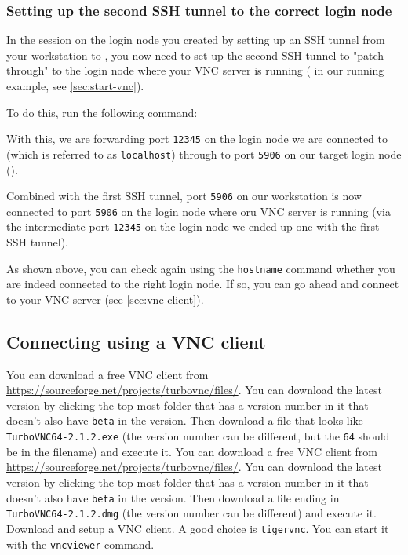 \subsubsection{Setting up the second SSH tunnel to the correct login node}

In the session on the login node you created by setting up an SSH tunnel from your workstation
to \texttt{\loginnode}, you now need to set up the second SSH tunnel to "patch through" to the login
node where your VNC server is running (\texttt{\loginhost} in our running example, see \autoref{sec:start-vnc}).

To do this, run the following command:

\begin{prompt}
\end{prompt}

With this, we are forwarding port \lstinline|12345| on the login node we are connected to (which is referred
to as \lstinline|localhost|) through to port \lstinline|5906| on our target login node (\texttt{\loginhost}).

Combined with the first SSH tunnel, port \lstinline|5906| on our workstation is now connected to
port \lstinline|5906| on the login node where oru VNC server is running (via the intermediate port \lstinline|12345|
on the login node we ended up one with the first SSH tunnel).


As shown above, you can check again using the \lstinline|hostname| command whether you are indeed connected
to the right login node. If so, you can go ahead and connect to your VNC server (see \autoref{sec:vnc-client}).

\subsection{Connecting using a VNC client}
\label{sec:vnc-client}

\ifwindows

You can download a free VNC client from \url{https://sourceforge.net/projects/turbovnc/files/}.
You can download the latest version by clicking the top-most folder that has a version number
in it that doesn't also have \lstinline|beta| in the version. Then download a file that looks like
\lstinline|TurboVNC64-2.1.2.exe| (the version number can be different, but the \lstinline|64|
should be in the filename) and execute it.
\fi
\ifmac
You can download a free VNC client from \url{https://sourceforge.net/projects/turbovnc/files/}.
You can download the latest version by clicking the top-most folder that has a version number
in it that doesn't also have \lstinline|beta| in the version. Then download a file ending in
\lstinline|TurboVNC64-2.1.2.dmg| (the version number can be different) and execute it.
\fi
\iflinux
Download and setup a VNC client. A good choice is \lstinline|tigervnc|. You can start
it with the \lstinline|vncviewer| command.
\fi

